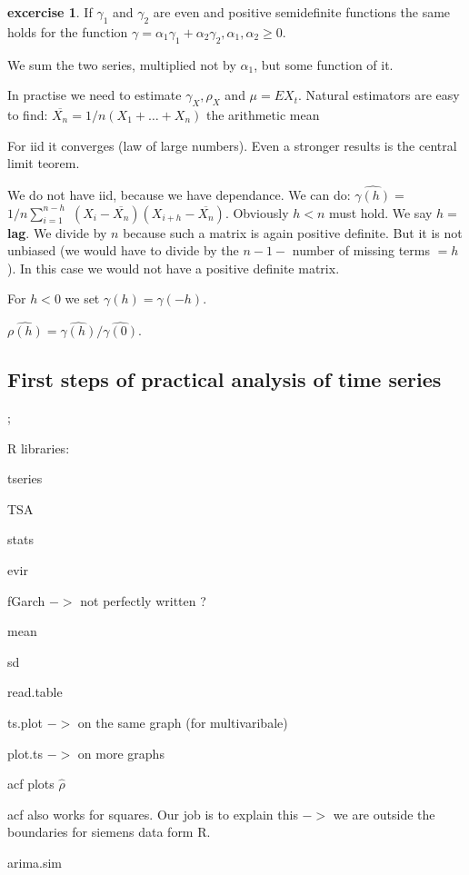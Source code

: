 \documentclass[12pt,a4paper]{amsart}
\theoremstyle{definition} %
\newtheorem{excercise}[defn]{excercise}
\theoremstyle{plain} %
\begin{document}
\begin{excercise}
If $\gamma_1$ and $\gamma_2$ are even and positive semidefinite functions the same holds for the function 
$\gamma = \alpha_1 \gamma_1 + \alpha_2 \gamma_2, \alpha_1, \alpha_2 \geq 0$. 

We sum the two series, multiplied not by $\alpha_1$, but some function of it.

In practise we need to estimate $\gamma_X, \rho_X$ and $\mu = EX_t$. Natural estimators are easy to find:
$\overline{X_n} = 1/n (X_1 + \dots + X_n)$ the arithmetic mean

For iid it converges (law of large numbers). Even a stronger results is the central limit teorem.

We do not have iid, because we have dependance. We can do:
$\hat{\gamma(h)} = $
$1/n \sum_{i = 1}^{n- h}$
$ (X_i - \overline{X_n})(X_{i+h} - \overline{X_n})$.
Obviously $h < n$ must hold. We say $h =$ {\bf  lag}.
We divide by $n$ because such a matrix is again positive definite. But it is not unbiased (we would have to divide by the $n - 1 - $ number of missing terms $= h$). In this case we would not have a positive definite matrix. 

For $h < 0$ we set $\gamma(h) = \gamma(-h)$.

$\hat{\rho(h)} = \hat{\gamma(h)} / \hat{\gamma(0)}$.

\end{excercise}





\subsection{First steps of practical analysis of time series}

;

R libraries:

tseries

TSA

stats

evir

fGarch $->$ not perfectly written ?

mean

sd

read.table

ts.plot $->$ on the same graph (for multivaribale)

plot.ts $->$ on more graphs

acf   plots $\hat{\rho}$

acf also works for squares. Our job is to explain this $->$ we are outside the boundaries for siemens data form R.

arima.sim
\end{document}
